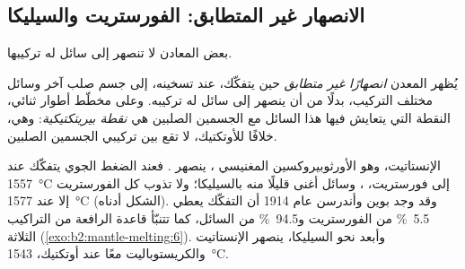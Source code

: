 \subsection*{الانصهار غير المتطابق: الفورستريت والسيليكا}

بعض المعادن لا تنصهر إلى سائل له تركيبها.

\begin{definition}\label{def:b2:mantle-melting:peritectic}
يُظهر المعدن \emph{انصهارًا غير متطابق} حين يتفكّك،
عند تسخينه، إلى جسم صلب آخر وسائل مختلف
التركيب، بدلًا من أن ينصهر إلى سائل له تركيبه. وعلى مخطّط
أطوار ثنائي، النقطة التي يتعايش فيها هذا السائل مع الجسمين الصلبين هي
\emph{نقطة بيريتكتيكية}: وهي، خلافًا للأوتكتيك، لا تقع
بين تركيبي الجسمين الصلبين.
\end{definition}

الإنستاتيت، وهو الأورثوبيروكسين المغنيسي ، ينصهر . فعند
الضغط الجوي يتفكّك عند \qty{1557}{\celsius} إلى فورستريت،
، وسائل أغنى قليلًا منه بالسيليكا؛ ولا تذوب كل
الفورستريت إلا عند \qty{1577}{\celsius} (الشكل أدناه). وقد وجد بوين
وأندرسن عام 1914 أن التفكّك يعطي \qty{5.5}{\percent} من
الفورستريت و\qty{94.5}{\percent} من السائل، كما تتنبّأ قاعدة الرافعة من
التراكيب الثلاثة (\cref{exo:b2:mantle-melting:6}). وأبعد نحو السيليكا، ينصهر الإنستاتيت
والكريستوباليت معًا عند أوتكتيك، \qty{1543}{\celsius}.

